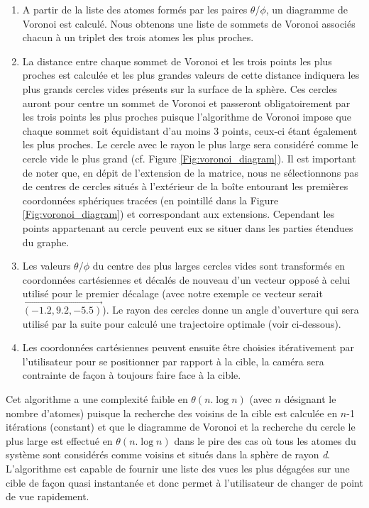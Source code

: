 \begin{enumerate}
	\item A partir de la liste des atomes formés par les paires $\theta$/$\phi$, un diagramme de Voronoi est calculé. Nous obtenons une liste de sommets de Voronoi associés chacun à un triplet des trois atomes les plus proches.
	\item La distance entre chaque sommet de Voronoi et les trois points les plus proches est calculée et les plus grandes valeurs de cette distance indiquera les plus grands cercles vides présents sur la surface de la sphère. Ces cercles auront pour centre un sommet de Voronoi et passeront obligatoirement par les trois points les plus proches puisque l'algorithme de Voronoi impose que chaque sommet soit équidistant d'au moins 3 points, ceux-ci étant également les plus proches. Le cercle avec le rayon le plus large sera considéré comme le cercle vide le plus grand (cf. Figure \ref{Fig:voronoi_diagram}). Il est important de noter que, en dépit de l'extension de la matrice, nous ne sélectionnons pas de centres de cercles situés à l'extérieur de la boîte entourant les premières coordonnées sphériques tracées (en pointillé dans la Figure \ref{Fig:voronoi_diagram}) et correspondant aux extensions. Cependant les points appartenant au cercle peuvent eux se situer dans les parties étendues du graphe.
	\item Les valeurs $\theta$/$\phi$ du centre des plus larges cercles vides sont transformés en coordonnées cartésiennes et décalés de nouveau d'un vecteur opposé à celui utilisé pour le premier décalage (avec notre exemple ce vecteur serait $\overrightarrow{(-1.2,9.2,-5.5)}$). Le rayon des cercles donne un angle d'ouverture qui sera utilisé par la suite pour calculé une trajectoire optimale (voir ci-dessous).
	\item Les coordonnées cartésiennes peuvent ensuite être choisies itérativement par l'utilisateur pour se positionner par rapport à la cible, la caméra sera contrainte de façon à toujours faire face à la cible.
\end{enumerate}

Cet algorithme a une complexité faible en $\theta(n.\log{n})$ (avec $n$ désignant le nombre d'atomes) puisque la recherche des voisins de la cible est calculée en $n$-1 itérations (constant) et que le diagramme de Voronoi et la recherche du cercle le plus large est effectué en $\theta(n.\log{n})$ dans le pire des cas où tous les atomes du système sont considérés comme voisins et situés dans la sphère de rayon \textit{d}. L'algorithme est capable de fournir une liste des vues les plus dégagées sur une cible de façon quasi instantanée et donc permet à l'utilisateur de changer de point de vue rapidement.

